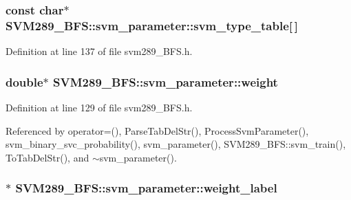 \subsubsection[{\texorpdfstring{svm\+\_\+type\+\_\+table}{svm_type_table}}]{\setlength{\rightskip}{0pt plus 5cm}const char$\ast$ S\+V\+M289\+\_\+\+B\+F\+S\+::svm\+\_\+parameter\+::svm\+\_\+type\+\_\+table\mbox{[}$\,$\mbox{]}\hspace{0.3cm}{\ttfamily [static]}}\hypertarget{struct_s_v_m289___b_f_s_1_1svm__parameter_ad4378aff189e168ea6fd8eda79b5bbe7}{}\label{struct_s_v_m289___b_f_s_1_1svm__parameter_ad4378aff189e168ea6fd8eda79b5bbe7}


Definition at line 137 of file svm289\+\_\+\+B\+F\+S.\+h.

\subsubsection[{\texorpdfstring{weight}{weight}}]{\setlength{\rightskip}{0pt plus 5cm}double$\ast$ S\+V\+M289\+\_\+\+B\+F\+S\+::svm\+\_\+parameter\+::weight}\hypertarget{struct_s_v_m289___b_f_s_1_1svm__parameter_a72708216adcfcbaf21dc5133f7c30e07}{}\label{struct_s_v_m289___b_f_s_1_1svm__parameter_a72708216adcfcbaf21dc5133f7c30e07}


Definition at line 129 of file svm289\+\_\+\+B\+F\+S.\+h.



Referenced by operator=(), Parse\+Tab\+Del\+Str(), Process\+Svm\+Parameter(), svm\+\_\+binary\+\_\+svc\+\_\+probability(), svm\+\_\+parameter(), S\+V\+M289\+\_\+\+B\+F\+S\+::svm\+\_\+train(), To\+Tab\+Del\+Str(), and $\sim$svm\+\_\+parameter().

\subsubsection[{\texorpdfstring{weight\+\_\+label}{weight_label}}]{$\ast$ S\+V\+M289\+\_\+\+B\+F\+S\+::svm\+\_\+parameter\+::weight\+\_\+label}\hypertarget{struct_s_v_m289___b_f_s_1_1svm__parameter_aa5fb22fef16001db2528f7ba4554758d}{}\label{struct_s_v_m289___b_f_s_1_1svm__parameter_aa5fb22fef16001db2528f7ba4554758d}


